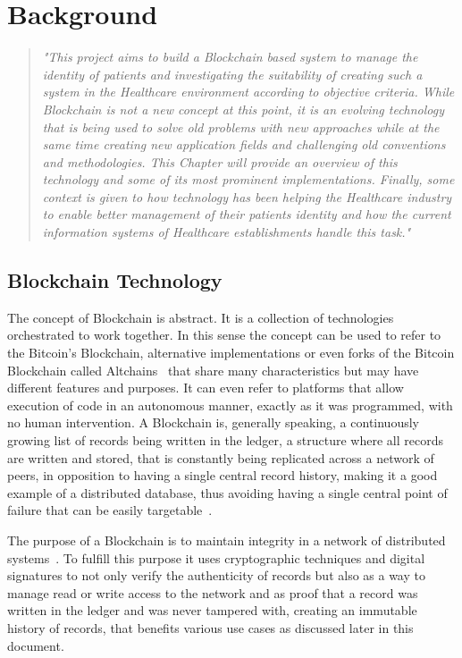 \chapter{Background}\label{background}


\begin{quote} \emph{"This project aims to build a Blockchain based system to
  manage the identity of patients and investigating the suitability of creating
  such a system in the Healthcare environment according to objective criteria.
  While Blockchain is not a new concept at this point, it is an evolving
  technology that is being used to solve old problems with new approaches while
  at the same time creating new application fields and challenging old
  conventions and methodologies. This Chapter will provide an overview of this
  technology and some of its most prominent implementations. Finally, some
  context is given to how technology has been helping the Healthcare industry
  to enable better management of their patients identity and how the current
  information systems of Healthcare establishments handle this task."}
\end{quote}

\section{Blockchain Technology}

The concept of Blockchain is abstract. It is a collection of technologies
orchestrated to work together. In this sense the concept can be used to refer
to the Bitcoin's Blockchain, alternative implementations or even forks of the
Bitcoin Blockchain called Altchains~\cite{Lewis2015} that share many
characteristics but may have different features and purposes. It can even
refer to platforms that allow execution of code in an autonomous manner,
exactly as it was programmed, with no human intervention.  A Blockchain is,
generally speaking, a continuously growing list of records being written in
the ledger, a structure where all records are written and stored, that is
constantly being replicated across a network of peers, in opposition to
having a single central record history, making it a good example of a
distributed database, thus avoiding having a single central point of failure
that can be easily targetable~\cite{Barclay2017}.

The purpose of a Blockchain is to maintain integrity in a network of
distributed systems~\cite{Drescher2017}. To fulfill this purpose it uses
cryptographic techniques and digital signatures to not only verify the
authenticity of records but also as a way to manage read or write access to
the network and as proof that a record was written in the ledger and was
never tampered with, creating an immutable history of records, that benefits
various use cases as discussed later in this document.


